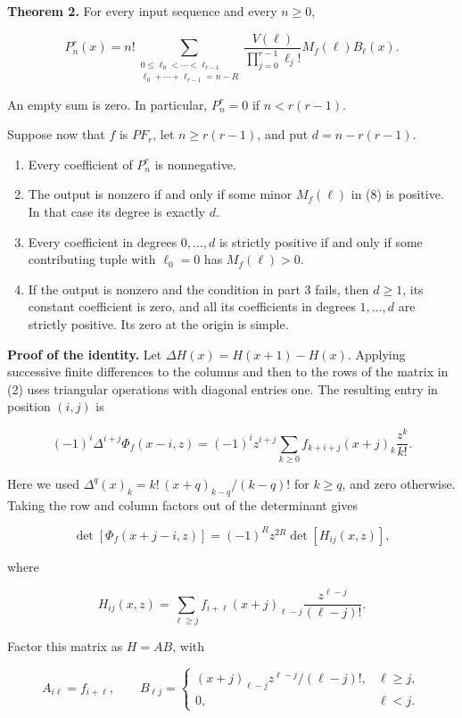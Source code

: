 \documentclass[11pt]{article}
\providecommand{\tightlist}{\setlength{\itemsep}{0pt}\setlength{\parskip}{0pt}}
\begin{document}
\textbf{Theorem 2.} For every input sequence and every \(n\ge0\),

\[
P_n^r(x)=n!\sum_{\substack{0\le\ell_0<\cdots<\ell_{r-1}\\
\ell_0+\cdots+\ell_{r-1}=n-R}}
\frac{V(\ell)}{\prod_{j=0}^{r-1}\ell_j!}
M_f(\ell)B_\ell(x).
\tag{8}
\]

An empty sum is zero. In particular, \(P_n^r=0\) if \(n<r(r-1)\).

Suppose now that \(f\) is \(PF_r\), let \(n\ge r(r-1)\), and put
\(d=n-r(r-1)\).

\begin{enumerate}
\def\labelenumi{\arabic{enumi}.}
\tightlist
\item
  Every coefficient of \(P_n^r\) is nonnegative.
\item
  The output is nonzero if and only if some minor \(M_f(\ell)\) in (8)
  is positive. In that case its degree is exactly \(d\).
\item
  Every coefficient in degrees \(0,\ldots,d\) is strictly positive if
  and only if some contributing tuple with \(\ell_0=0\) has
  \(M_f(\ell)>0\).
\item
  If the output is nonzero and the condition in part 3 fails, then
  \(d\ge1\), its constant coefficient is zero, and all its coefficients
  in degrees \(1,\ldots,d\) are strictly positive. Its zero at the
  origin is simple.
\end{enumerate}

\textbf{Proof of the identity.} Let \(\Delta H(x)=H(x+1)-H(x)\).
Applying successive finite differences to the columns and then to the
rows of the matrix in (2) uses triangular operations with diagonal
entries one. The resulting entry in position \((i,j)\) is

\[
(-1)^i\Delta^{i+j}\Phi_f(x-i,z)
=(-1)^iz^{i+j}\sum_{k\ge0}
f_{k+i+j}(x+j)_k\frac{z^k}{k!}.
\]

Here we used \(\Delta^q(x)_k=k!\,(x+q)_{k-q}/(k-q)!\) for \(k\ge q\),
and zero otherwise. Taking the row and column factors out of the
determinant gives

\[
\det[\Phi_f(x+j-i,z)]
=(-1)^Rz^{2R}\det[H_{ij}(x,z)],
\tag{9}
\]

where

\[
H_{ij}(x,z)=\sum_{\ell\ge j}
f_{i+\ell}(x+j)_{\ell-j}\frac{z^{\ell-j}}{(\ell-j)!}.
\]

Factor this matrix as \(H=AB\), with

\[
A_{i\ell}=f_{i+\ell},\qquad
B_{\ell j}=\begin{cases}
(x+j)_{\ell-j}z^{\ell-j}/(\ell-j)!,&\ell\ge j,\\
0,&\ell<j.
\end{cases}
\]
\end{document}
